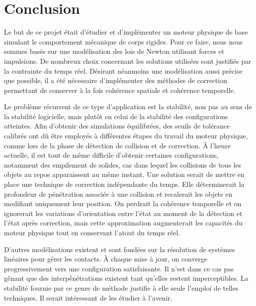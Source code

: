 \section{Conclusion}

Le but de ce projet était d'étudier et d'implémenter un moteur
physique de base simulant le comportement mécanique de corps
rigides. Pour ce faire, nous nous sommes basés sur une modélisation
des lois de Newton utilisant forces et impulsions. De nombreux choix
concernant les solutions utilisées sont justifiés par la contrainte du
temps réel. Désirant néanmoins une modélisation aussi précise que
possible, il a été nécessaire d'implémenter des méthodes de correction
permettant de conserver à la fois cohérence spatiale et cohérence
temporelle.

Le problème récurrent de ce type d'application est la stabilité, non
pas au sens de la stabilité logicielle, mais plutôt en celui de la
stabilité des configurations atteintes. Afin d'obtenir des simulations
équilibrées, des seuils de tolérance calibrés ont dû être employés à
différentes étapes du travail du moteur physique, comme lors de la
phase de détection de collision et de correction. \`A l'heure
actuelle, il est tout de même difficile d'obtenir certaines
configurations, notamment des empilement de solides, cas dans lequel
les collisions de tous les objets au repos apparaissent au même
instant. Une solution serait de mettre en place une technique de
correction indépendante du temps. Elle déterminerait la profondeur de
pénétration associée à une collision et recalerait les objets en
modifiant uniquement leur position. On perdrait la cohérence
temporelle et on ignorerait les variations d'orientation entre l'état
au moment de la détection et l'état après correction, mais cette
approximation augmenterait les capacités du moteur physique tout en
conservant l'atout du temps réel.

D'autres modélisations existent et sont fondées sur la résolution de
systèmes linéaires pour gérer les contacts. \`A chaque mise à jour, on
converge progressivement vers une configuration satisfaisante. Il
n'est dans ce cas pas gênant que des interpénétrations existent tant
qu'elles restent imperceptibles. La stabilité fournie par ce genre de
méthode justifie à elle seule l'emploi de telles techniques. Il serait
intéressant de les étudier à l'avenir.
